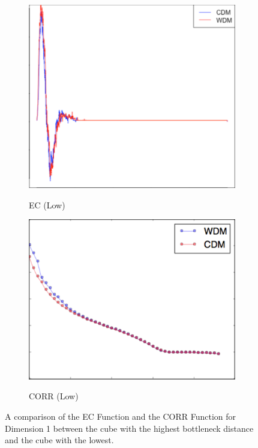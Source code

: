 \documentclass[12pt]{article}
\begin{document}
\begin{figure}[htp!]
    \begin{subfigure}{0.21\textwidth}
    \centering
        \caption{EC (Low)}
\includegraphics[width=\linewidth]{valid3.pdf}
    \label{fig:valid3}
  \end{subfigure}
    \begin{subfigure}{0.24\textwidth}
    \centering
        \caption{CORR (Low)}
\includegraphics[width=\linewidth]{valid4.pdf}
    \label{fig:valid4}
  \end{subfigure}
    \label{fig:validationfigs}
    \caption{A comparison of the EC Function and the CORR Function for Dimension 1 between the cube with the highest bottleneck distance and the cube with the lowest.}
\end{figure}
\end{document}
